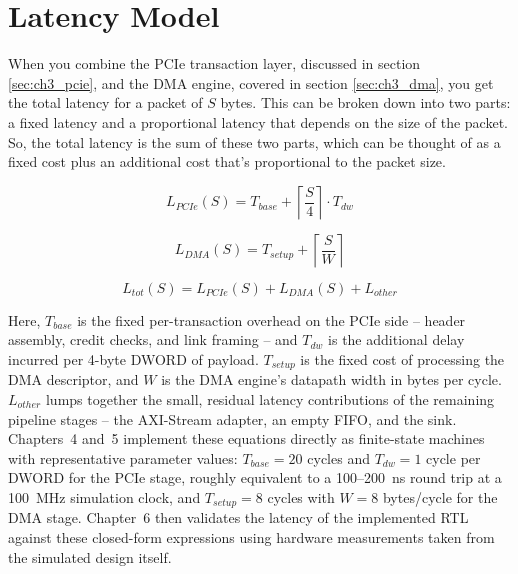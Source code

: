 
\section{Latency Model}
\label{sec:ch3_latency_model}

When you combine the PCIe transaction layer, discussed in section \autoref{sec:ch3_pcie}, and the DMA engine, covered in section \autoref{sec:ch3_dma}, you get the total latency for a packet of $S$ bytes. This can be broken down into two parts: a fixed latency and a proportional latency that depends on the size of the packet. So, the total latency is the sum of these two parts, which can be thought of as a fixed cost plus an additional cost that's proportional to the packet size.

\begin{equation}
L_{PCIe}(S) = T_{base} + \left\lceil \frac{S}{4} \right\rceil \cdot T_{dw}
\label{eq:pcie_latency}
\end{equation}

\begin{equation}
L_{DMA}(S) = T_{setup} + \left\lceil \frac{S}{W} \right\rceil
\label{eq:dma_latency}
\end{equation}

\begin{equation}
L_{tot}(S) = L_{PCIe}(S) + L_{DMA}(S) + L_{other}
\label{eq:total_latency}
\end{equation}

Here, $T_{base}$ is the fixed per-transaction overhead on the PCIe side -- header assembly, credit checks, and link framing -- and $T_{dw}$ is the additional delay incurred per 4-byte DWORD of payload. $T_{setup}$ is the fixed cost of processing the DMA descriptor, and $W$ is the DMA engine's datapath width in bytes per cycle. $L_{other}$ lumps together the small, residual latency contributions of the remaining pipeline stages -- the AXI-Stream adapter, an empty FIFO, and the sink. Chapters~4 and~5 implement these equations directly as finite-state machines with representative parameter values: $T_{base}=20$ cycles and $T_{dw}=1$ cycle per DWORD for the PCIe stage, roughly equivalent to a 100--200~ns round trip at a 100~MHz simulation clock, and $T_{setup}=8$ cycles with $W=8$ bytes/cycle for the DMA stage. Chapter~6 then validates the latency of the implemented RTL against these closed-form expressions using hardware measurements taken from the simulated design itself.

